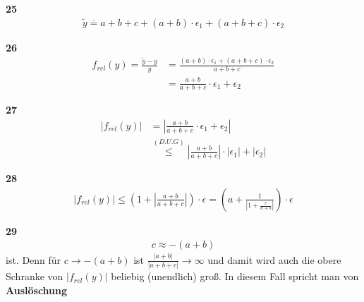 \documentclass[13pt]{scrreprt}
\newenvironment{ebox}[1]{\textbf{#1}\\}{}
\begin{document}
\begin{ebox}{25}
	\begin{align*}
	\tilde{y} \overset{\cdot}{=}  a + b + c + (a+b)\cdot\epsilon_1 + (a + b +c)\cdot\epsilon_2
	\end{align*}
\end{ebox}

\begin{ebox}{26}
	\begin{align*}
	f_{rel}(y) = \frac{\tilde{y} - y}{y} &= \frac{(a+b)\cdot\epsilon_1 + (a + b +c)\cdot\epsilon_2}{a + b + c}\\
	&= \frac{a+b}{a+b+c}\cdot\epsilon_1 + \epsilon_2
	\end{align*}
\end{ebox}

\begin{ebox}{27}
	\begin{align}
	|f_{rel}(y)| &= |\frac{a+b}{a+b+c}\cdot\epsilon_1 + \epsilon_2|\\ &\overset{(D.U.G)}{\leqslant} |\frac{a+b}{a+b+c}|\cdot|\epsilon_1| + |\epsilon_2|
	\end{align}
\end{ebox}

\begin{ebox}{28}
	\begin{align*}
	|f_{rel}(y)| \leqslant (1+ | \frac{a+b}{a+b+c}|) \cdot \epsilon = (a+ \frac{1}{|1 + \frac{c}{a+b}|}) \cdot \epsilon
	\end{align*}
\end{ebox}

\begin{ebox}{29}
	\begin{align*}
	c \approx -(a+b)
	\end{align*}
	ist. Denn für $c \rightarrow -(a+b)$ ist $ \frac{|a+b|}{|a+b+c|} \rightarrow \infty$ und damit wird auch die obere Schranke von $|f_{rel}(y)|$ beliebig (unendlich) groß. In diesem Fall spricht man von \textbf{Auslöschung}
\end{ebox}
\end{document}
